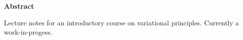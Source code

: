 
\clearpage
{}
{}
\begin{adjustwidth}{0.1\textwidth}{0.1\textwidth}
\begingroup
\null\vspace{0.2\textheight}
\begin{center}
{\bfseries\Large Abstract}\par\vspace{2em}

Lecture notes for an introductory course on variational principles. Currently a work-in-progess.
\end{center}
\endgroup
\end{adjustwidth}
\clearpage